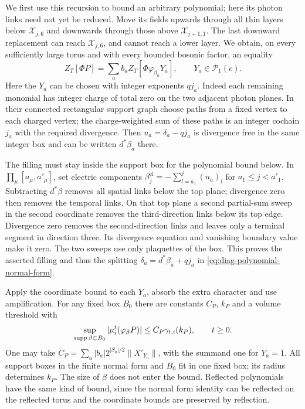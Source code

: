We first use this recursion to bound an arbitrary polynomial;
here its photon links need not yet be reduced. Move its fields
upwards through all thin layers below $\mathcal X_{j,6}$ and
downwards through those above $\mathcal X_{j+1,1}$. The last
downward replacement can reach $\mathcal X_{j,6}$, and cannot
reach a lower layer. We obtain, on every sufficiently large
torus and with every bounded bosonic factor, an equality
\begin{equation}\label{eq:diag-polynomial-normal-form}
 Z_T[\Phi P]=\sum_a b_a Z_T[\Phi\varphi_{\beta_a}Y_a],
 \qquad Y_a\in\mathcal P_1(c).
\end{equation}
Here the $Y_a$ can be chosen with integer exponents $qj_a$.
Indeed each remaining monomial has integer charge of total
zero on the two adjacent photon planes. In their connected
rectangular support graph choose paths from a fixed vertex
to each charged vertex; the charge-weighted sum of these
paths is an integer cochain $j_a$ with the required divergence.
Then $u_a=\delta_a-qj_a$ is divergence free in the same
integer box and can be written $d^*\beta_a$ there.

The filling must stay inside the support box for the polynomial
bound below. In
$\prod_\mu[a_\mu,a'_\mu]$, set electric components
$\beta_j^{\mathrm{el}}=-\sum_{l=a_1}^j(u_a)_l$ for
$a_1\le j<a'_1$. Subtracting $d^*\beta$ removes all spatial
links below the top plane; divergence zero then removes
the temporal links. On that top plane a second partial-sum
sweep in the second coordinate removes the third-direction
links below its top edge. Divergence zero removes the
second-direction links and leaves only a terminal segment
in direction three. Its divergence equation and vanishing
boundary value make it zero. The two sweeps use only
plaquettes of the box. This proves the asserted filling
and thus the splitting $\delta_a=d^*\beta_a+qj_a$ in
\eqref{eq:diag-polynomial-normal-form}.

Apply the coordinate bound to each $Y_a$, absorb the extra
character and use amplification. For any fixed box $B_0$
there are constants $C_P$, $k_P$ and a volume threshold with
\begin{equation}\label{eq:diag-polynomial-apriori}
 \sup_{\operatorname{supp}\beta\subset B_0}
       |\mu_i^t(\varphi_\beta P)|
             \le C_P\gamma_{t,i}(k_P),\qquad t\ge0.
\end{equation}
One may take
$C_P=\sum_a|b_a|2^{|S_a|/2}\|X'_{Y_a}\|$, with the summand
one for $Y_a=1$. All support boxes in the finite normal form
and $B_0$ fit in one fixed box; its radius determines $k_P$.
The size of $\beta$ does not enter the bound. Reflected
polynomials have the same kind of bound, since the normal
form identity can be reflected on the reflected torus and
the coordinate bounds are preserved by reflection.

